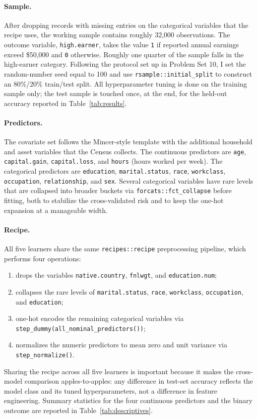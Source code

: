 \documentclass[12pt,english]{article}
\begin{document}
\paragraph{Sample.}
After dropping records with missing entries on the categorical variables
that the recipe uses, the working sample contains roughly 32{,}000
observations. The outcome variable, \texttt{high.earner}, takes the value
\texttt{1} if reported annual earnings exceed \$50{,}000 and \texttt{0}
otherwise. Roughly one quarter of the sample falls in the high-earner
category. Following the protocol set up in Problem Set 10, I set the
random-number seed equal to 100 and use \texttt{rsample::initial\_split}
to construct an 80\%/20\% train/test split. All hyperparameter tuning is
done on the training sample only; the test sample is touched once, at
the end, for the held-out accuracy reported in Table~\ref{tab:results}.

\paragraph{Predictors.}
The covariate set follows the Mincer-style template with the additional
household and asset variables that the Census collects. The continuous
predictors are \texttt{age}, \texttt{capital.gain}, \texttt{capital.loss},
and \texttt{hours} (hours worked per week). The categorical predictors are
\texttt{education}, \texttt{marital.status}, \texttt{race},
\texttt{workclass}, \texttt{occupation}, \texttt{relationship}, and
\texttt{sex}. Several categorical variables have rare levels that are
collapsed into broader buckets via \texttt{forcats::fct\_collapse} before
fitting, both to stabilize the cross-validated risk and to keep the
one-hot expansion at a manageable width.

\paragraph{Recipe.}
All five learners share the same \texttt{recipes::recipe} preprocessing
pipeline, which performs four operations:
\begin{enumerate}
\item drops the variables \texttt{native.country}, \texttt{fnlwgt}, and
\texttt{education.num};
\item collapses the rare levels of \texttt{marital.status}, \texttt{race},
\texttt{workclass}, \texttt{occupation}, and \texttt{education};
\item one-hot encodes the remaining categorical variables via
\texttt{step\_dummy(all\_nominal\_predictors())};
\item normalizes the numeric predictors to mean zero and unit variance
via \texttt{step\_normalize()}.
\end{enumerate}
Sharing the recipe across all five learners is important because it makes
the cross-model comparison apples-to-apples: any difference in test-set
accuracy reflects the model class and its tuned hyperparameters, not a
difference in feature engineering. Summary statistics for the four
continuous predictors and the binary outcome are reported in
Table~\ref{tab:descriptives}.
\end{document}
